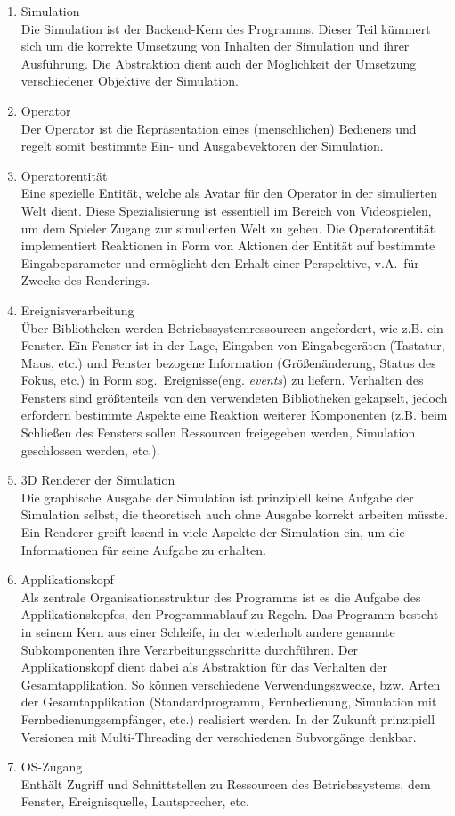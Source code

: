\begin{enumerate}
\item Simulation\\
Die Simulation ist der Backend-Kern des Programms. Dieser Teil kümmert sich um die korrekte Umsetzung von Inhalten der Simulation und ihrer Ausführung. Die Abstraktion dient auch der Möglichkeit der Umsetzung verschiedener Objektive der Simulation.
\item Operator\\
Der Operator ist die Repräsentation eines (menschlichen) Bedieners und regelt somit bestimmte Ein- und Ausgabevektoren der Simulation.
\item Operatorentität\\
Eine spezielle Entität, welche als Avatar für den Operator in der simulierten Welt dient. Diese Spezialisierung ist essentiell im Bereich von Videospielen, um dem Spieler Zugang zur simulierten Welt zu geben. Die Operatorentität implementiert Reaktionen in Form von Aktionen der Entität auf bestimmte Eingabeparameter und ermöglicht den Erhalt einer Perspektive, v.A.~für Zwecke des Renderings.
\item Ereignisverarbeitung\\
Über Bibliotheken werden Betriebssystemressourcen angefordert, wie z.B. ein Fenster. Ein Fenster ist in der Lage, Eingaben von Eingabegeräten (Tastatur, Maus, etc.) und Fenster bezogene Information (Größenänderung, Status des Fokus, etc.) in Form sog.~Ereignisse(eng. \textit{events}) zu liefern. Verhalten des Fensters sind größtenteils von den verwendeten Bibliotheken gekapselt, jedoch erfordern bestimmte Aspekte eine Reaktion weiterer Komponenten (z.B. beim Schließen des Fensters sollen Ressourcen freigegeben werden, Simulation geschlossen werden, etc.).
\item 3D Renderer der Simulation\\
Die graphische Ausgabe der Simulation ist prinzipiell keine Aufgabe der Simulation selbst, die theoretisch auch ohne Ausgabe korrekt arbeiten müsste. Ein Renderer greift lesend in viele Aspekte der Simulation ein, um die Informationen für seine Aufgabe zu erhalten.

\item Applikationskopf\\
Als zentrale Organisationsstruktur des Programms ist es die Aufgabe des Applikationskopfes, den Programmablauf zu Regeln. Das Programm besteht in seinem Kern aus einer Schleife, in der wiederholt andere genannte Subkomponenten ihre Verarbeitungsschritte durchführen. Der Applikationskopf dient dabei als Abstraktion für das Verhalten der Gesamtapplikation. So können verschiedene Verwendungszwecke, bzw. Arten der Gesamtapplikation (Standardprogramm, Fernbedienung, Simulation mit Fernbedienungsempfänger, etc.) realisiert werden. In der Zukunft prinzipiell Versionen mit Multi-Threading der verschiedenen Subvorgänge denkbar.

\item OS-Zugang\\
Enthält Zugriff und Schnittstellen zu Ressourcen des Betriebssystems, dem Fenster, Ereignisquelle, Lautsprecher, etc.
\end{enumerate}


